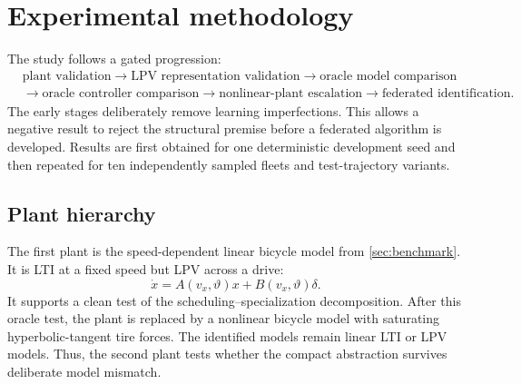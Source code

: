 \section{Experimental methodology}
\label{sec:methodology}
The study follows a gated progression:
\begin{equation}
\begin{split}
&\text{plant validation}\rightarrow\text{LPV representation validation}
\rightarrow\text{oracle model comparison}\\
&\rightarrow\text{oracle controller comparison}
\rightarrow\text{nonlinear-plant escalation}
\rightarrow\text{federated identification}.
\end{split}
\end{equation}
The early stages deliberately remove learning imperfections. This allows a
negative result to reject the structural premise before a federated algorithm is
developed. Results are first obtained for one deterministic development seed and
then repeated for ten independently sampled fleets and test-trajectory variants.

\subsection{Plant hierarchy}
The first plant is the speed-dependent linear bicycle model from
\cref{sec:benchmark}. It is LTI at a fixed speed but LPV across a drive:
\begin{equation}
 \dot x=A(v_x,\vartheta)x+B(v_x,\vartheta)\delta.
\end{equation}
It supports a clean test of the scheduling--specialization decomposition. After
this oracle test, the plant is replaced by a nonlinear bicycle model with
saturating hyperbolic-tangent tire forces. The identified models remain linear
LTI or LPV models. Thus, the second plant tests whether the compact abstraction
survives deliberate model mismatch.

